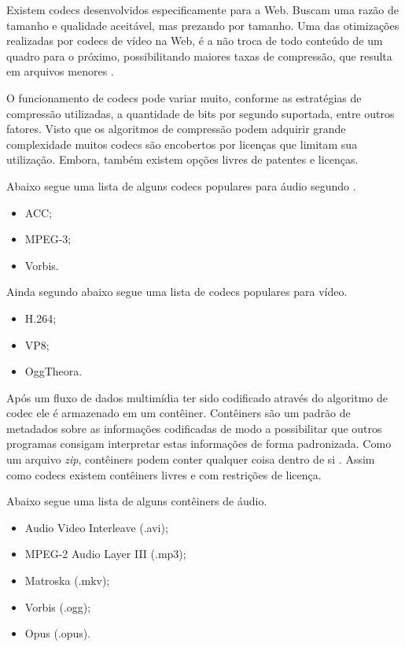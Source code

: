 Existem codecs desenvolvidos especificamente para a Web. Buscam
uma razão de tamanho e qualidade aceitável, mas prezando por
tamanho. Uma das otimizações realizadas por codecs de vídeo na
Web, é a não troca de todo conteúdo de um quadro para o próximo,
possibilitando maiores taxas de compressão, que resulta em arquivos
menores \autocite{diveIntohtml}.

O funcionamento de codecs pode variar muito, conforme as estratégias
de compressão utilizadas, a quantidade de bits por segundo suportada,
entre outros fatores. Visto que os algoritmos de compressão podem
adquirir grande complexidade muitos codecs são encobertos por licenças
que limitam sua utilização. Embora, também existem opções
livres de patentes e licenças.

Abaixo segue uma lista de alguns codecs populares para áudio segundo
\citet[p. 67]{proHtml5}.

\begin{itemize}
    \item ACC;
    \item MPEG-3;
    \item Vorbis.
\end{itemize}

Ainda segundo \citet[p. 67]{proHtml5} abaixo segue uma lista de codecs populares para vídeo.
\begin{itemize}
    \item H.264;
    \item VP8;
    \item OggTheora.
\end{itemize}

Após um fluxo de dados multimídia ter sido codificado através do
algoritmo de codec ele é armazenado em um contêiner. Contêiners
são um padrão de metadados sobre as informações codificadas
de modo a possibilitar que outros programas consigam interpretar
estas informações de forma padronizada. Como um arquivo
\textit{zip}, contêiners podem conter qualquer coisa dentro de si
\autocite{diveIntohtml}. Assim como codecs existem contêiners livres e
com restrições de licença.

\noindent Abaixo segue uma lista de alguns contêiners de áudio.
\begin{itemize}
    \item Audio Video Interleave (.avi);
    \item MPEG-2 Audio Layer III (.mp3);
    \item Matroska (.mkv);
    \item Vorbis (.ogg);
    \item Opus (.opus).
\end{itemize}

